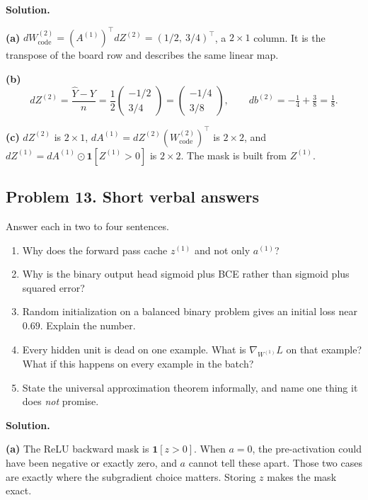 \textbf{Solution.}

\textbf{(a)} $dW^{(2)}_{\text{code}} = (A^{(1)})^\top dZ^{(2)} = (1/2,\ 3/4)^\top$, a $2\times 1$ column. It is the transpose of the board row and describes the same linear map.

\textbf{(b)}
\[
dZ^{(2)} = \frac{\hat Y - Y}{n} = \frac12\begin{pmatrix}-1/2\\3/4\end{pmatrix} = \begin{pmatrix}-1/4\\3/8\end{pmatrix},\qquad db^{(2)} = -\tfrac14 + \tfrac38 = \tfrac18.
\]

\textbf{(c)} $dZ^{(2)}$ is $2\times 1$, $dA^{(1)} = dZ^{(2)}(W^{(2)}_{\text{code}})^\top$ is $2\times 2$, and $dZ^{(1)} = dA^{(1)}\odot\mathbf 1[Z^{(1)} > 0]$ is $2\times 2$. The mask is built from $Z^{(1)}$.

\subsection*{Problem 13. Short verbal answers}

Answer each in two to four sentences.

\begin{enumerate}[label=(\alph*)]
\item Why does the forward pass cache $z^{(1)}$ and not only $a^{(1)}$?
\item Why is the binary output head sigmoid plus BCE rather than sigmoid plus squared error?
\item Random initialization on a balanced binary problem gives an initial loss near $0.69$. Explain the number.
\item Every hidden unit is dead on one example. What is $\nabla_{W^{(1)}}L$ on that example? What if this happens on every example in the batch?
\item State the universal approximation theorem informally, and name one thing it does \emph{not} promise.
\end{enumerate}

\textbf{Solution.}

\textbf{(a)} The ReLU backward mask is $\mathbf 1[z > 0]$. When $a = 0$, the pre-activation could have been negative or exactly zero, and $a$ cannot tell these apart. Those two cases are exactly where the subgradient choice matters. Storing $z$ makes the mask exact.

